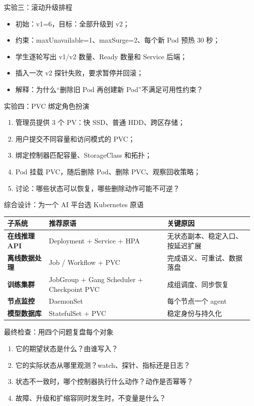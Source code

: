 \documentclass[UTF8,fontset=none,aspectratio=169,10pt]{beamer}
\begin{document}
\begin{frame}{实验三：滚动升级排程}
\begin{itemize}
  \item 初始：v1=6，目标：全部升级到 v2；
  \item 约束：maxUnavailable=1、maxSurge=2、每个新 Pod 预热 30 秒；
  \item 学生逐轮写出 v1/v2 数量、Ready 数量和 Service 后端；
  \item 插入一次 v2 探针失败，要求暂停并回滚；
  \item 解释：为什么“删除旧 Pod 再创建新 Pod”不满足可用性约束？
\end{itemize}
\end{frame}

\begin{frame}{实验四：PVC 绑定角色扮演}
\begin{enumerate}
  \item 管理员提供 3 个 PV：快 SSD、普通 HDD、跨区存储；
  \item 用户提交不同容量和访问模式的 PVC；
  \item 绑定控制器匹配容量、StorageClass 和拓扑；
  \item Pod 挂载 PVC，随后删除 Pod、删除 PVC、观察回收策略；
  \item 讨论：哪些状态可以恢复，哪些删除动作可能不可逆？
\end{enumerate}
\end{frame}

\begin{frame}{综合设计：为一个 AI 平台选 Kubernetes 原语}
\scriptsize
\begin{tabularx}{\linewidth}{>{\bfseries}p{3cm}XX}
\toprule
子系统 & 推荐原语 & 关键原因 \\
\midrule
在线推理 API & Deployment + Service + HPA & 无状态副本、稳定入口、按延迟扩展 \\
离线数据处理 & Job / Workflow + PVC & 完成语义、可重试、数据落盘 \\
训练集群 & JobGroup + Gang Scheduler + Checkpoint PVC & 成组调度、同步恢复 \\
节点监控 & DaemonSet & 每个节点一个 agent \\
模型数据库 & StatefulSet + PVC & 稳定身份与持久化 \\
\bottomrule
\end{tabularx}
\vfill
{}
\end{frame}

\begin{frame}{最终检查：用四个问题复盘每个对象}
\begin{enumerate}
  \item 它的期望状态是什么？由谁写入？
  \item 它的实际状态从哪里观测？watch、探针、指标还是日志？
  \item 状态不一致时，哪个控制器执行什么动作？动作是否幂等？
  \item 故障、升级和扩缩容同时发生时，不变量是什么？
\end{enumerate}
\vfill
{}
\end{frame}
\end{document}
